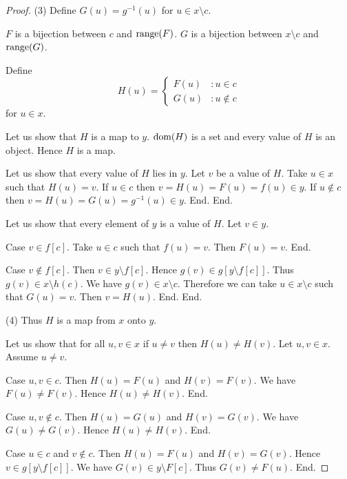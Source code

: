 \documentclass{article}
\begin{document}
\begin{forthel}
\begin{proof}
        (3) Define $G(u) = g^{-1}(u)$ for $u \in x \setminus c$.

        $F$ is a bijection between $c$ and $\operatorname{range}(F)$.
        $G$ is a bijection between $x \setminus c$ and $\operatorname{range}(G)$.

        Define \[ H(u) =
          \begin{cases}
            F(u) & : u \in c \\
            G(u) & : u \notin c
          \end{cases} \]
        for $u \in x$.

        Let us show that $H$ is a map to $y$.
          $\operatorname{dom}(H)$ is a set and every value of $H$ is an object.
          Hence $H$ is a map.

          Let us show that every value of $H$ lies in $y$.
            Let $v$ be a value of $H$.
            Take $u \in x$ such that $H(u) = v$.
            If $u \in c$ then $v = H(u) = F(u) = f(u) \in y$.
            If $u \notin c$ then $v = H(u) = G(u) = g^{-1}(u) \in y$.
          End.
        End.

        Let us show that every element of $y$ is a value of $H$.
          Let $v \in y$.

          Case $v \in f[c]$.
            Take $u \in c$ such that $f(u) = v$.
            Then $F(u) = v$.
          End.

          Case $v \notin f[c]$.
            Then $v \in y \setminus f[c]$.
            Hence $g(v) \in g[y \setminus f[c]]$.
            Thus $g(v) \in x \setminus h(c)$.
            We have $g(v) \in x \setminus c$.
            Therefore we can take $u \in x \setminus c$ such that $G(u) = v$.
            Then $v = H(u)$.
          End.
        End.

        (4) Thus $H$ is a map from $x$ onto $y$.

        Let us show that for all $u, v \in x$ if $u \neq v$ then
        $H(u) \neq H(v)$.
          Let $u,v \in x$.
          Assume $u \neq v$.

          Case $u,v \in c$.
            Then $H(u) = F(u)$ and $H(v) = F(v)$.
            We have $F(u) \neq F(v)$.
            Hence $H(u) \neq H(v)$.
          End.

          Case $u,v \notin c$.
            Then $H(u) = G(u)$ and $H(v) = G(v)$.
            We have $G(u) \neq G(v)$.
            Hence $H(u) \neq H(v)$.
          End.

          Case $u \in c$ and $v \notin c$.
            Then $H(u) = F(u)$ and $H(v) = G(v)$.
            Hence $v \in g[y \setminus f[c]]$.
            We have $G(v) \in y \setminus F[c]$.
            Thus $G(v) \neq F(u)$.
          End.


\end{proof}
\end{forthel}
\end{document}
